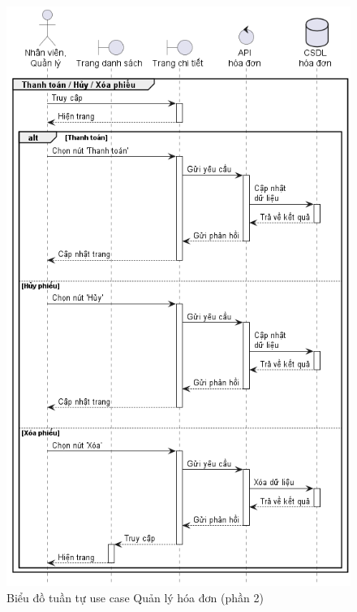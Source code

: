 \documentclass[../DoAn.tex]{subfiles}
\begin{document}
\begin{figure}[H]
    \centering
    \includegraphics[width=1\textwidth]{Hinhve/sequences/InvoiceManage2.png}
    \caption{Biểu đồ tuần tự use case Quản lý hóa đơn (phần 2)}
    \label{figure:sd-invoice-manage2}
\end{figure}
\break
\end{document}

